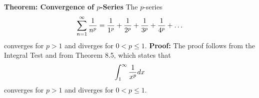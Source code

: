 \nopagenumbers
{\bf Theorem: Convergence of $p$-Series}
\vskip 6pt
The $p$-series $$\sum_{n=1}^\infty {1 \over n^p}={1 \over 1^p}+{1 \over 2^p}+{1 \over 3^p}+{1 \over 4^p}+\ldots$$ converges for $p>1$ and diverges for $0<p \leq 1$.
\vskip 10pt
{\bf Proof:}
\vskip 6pt
The proof follows from the Integral Test and from Theorem 8.5, which states that $$\int_1^\infty {1\over x^p}dx$$ converges for $p>1$ and diverges for $0<p \leq 1$.

\vfill\eject
